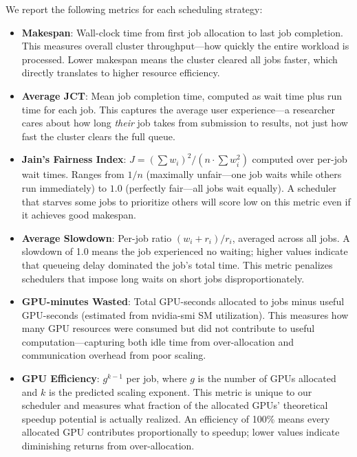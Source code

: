 \documentclass[letterpaper,10pt]{article}
\begin{document}
We report the following metrics for each scheduling strategy:

\begin{itemize}
    \item \textbf{Makespan}: Wall-clock time from first job allocation to last job completion. This measures overall cluster throughput---how quickly the entire workload is processed. Lower makespan means the cluster cleared all jobs faster, which directly translates to higher resource efficiency.

    \item \textbf{Average JCT}: Mean job completion time, computed as wait time plus run time for each job. This captures the average user experience---a researcher cares about how long \textit{their} job takes from submission to results, not just how fast the cluster clears the full queue.

    \item \textbf{Jain's Fairness Index}: $J = (\sum w_i)^2 / (n \cdot \sum w_i^2)$ computed over per-job wait times. Ranges from $1/n$ (maximally unfair---one job waits while others run immediately) to $1.0$ (perfectly fair---all jobs wait equally). A scheduler that starves some jobs to prioritize others will score low on this metric even if it achieves good makespan.

    \item \textbf{Average Slowdown}: Per-job ratio $(w_i + r_i) / r_i$, averaged across all jobs. A slowdown of 1.0 means the job experienced no waiting; higher values indicate that queueing delay dominated the job's total time. This metric penalizes schedulers that impose long waits on short jobs disproportionately.

    \item \textbf{GPU-minutes Wasted}: Total GPU-seconds allocated to jobs minus useful GPU-seconds (estimated from nvidia-smi SM utilization). This measures how many GPU resources were consumed but did not contribute to useful computation---capturing both idle time from over-allocation and communication overhead from poor scaling.

    \item \textbf{GPU Efficiency}: $g^{k-1}$ per job, where $g$ is the number of GPUs allocated and $k$ is the predicted scaling exponent. This metric is unique to our scheduler and measures what fraction of the allocated GPUs' theoretical speedup potential is actually realized. An efficiency of 100\% means every allocated GPU contributes proportionally to speedup; lower values indicate diminishing returns from over-allocation.
\end{itemize}
\end{document}

